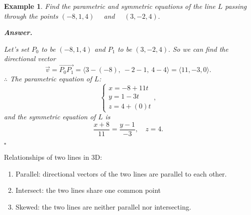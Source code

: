 \documentclass[12pt,a4paper]{article}
\newtheorem{eg}{Example}[subsection]
\newenvironment*{ans}{\par\indent\textbf{\textit{Answer. }}\par}{\par\hfill{$\square$}\par}
\def\vecv{\vec{v}}
\begin{document}
\begin{eg}
	Find the parametric and symmetric equations of the line $L$ passing through the points $(-8,1,4)\quad$ and $\quad (3,-2,4).$
	\begin{ans}
		Let's set $P_0$ to be $(-8,1,4)$ and $P_1$ to be $(3,-2,4).$ So we can find the directional vector \[\vecv=\overrightarrow{P_0P_1}=\langle3-(-8),\ -2-1,\ 4-4\rangle=\langle11,-3,0\rangle.\]
		$\therefore$ The parametric equation of $L$: \[\begin{cases}x=-8+11t\\y=1-3t\\z=4+(0)t\end{cases}, \]
		and the symmetric equation of $L$ is \[\frac{x+8}{11}=\frac{y-1}{-3},\quad z=4.\]
	\end{ans}
\end{eg}
Relationships of two lines in 3D: 
\begin{enumerate}
	\item Parallel: directional vectors of the two lines are parallel to each other.
	\item Intersect: the two lines share one common point
	\item Skewed: the two lines are neither parallel nor intersecting. 
\end{enumerate}
\end{document}
